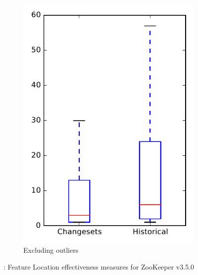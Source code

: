 \begin{figure}
\begin{subfigure}{.4\textwidth}
        \includegraphics[height=0.4\textheight]{figures/flt/rq2_zookeeper_no_outlier}
        \caption{Excluding outliers}\label{fig:flt:rq2:zookeeper_no_outlier}
    \end{subfigure}
\caption{\ftwo: Feature Location effectiveness measures for ZooKeeper v3.5.0}
\label{fig:flt:rq2:zookeeper}
\end{figure}
